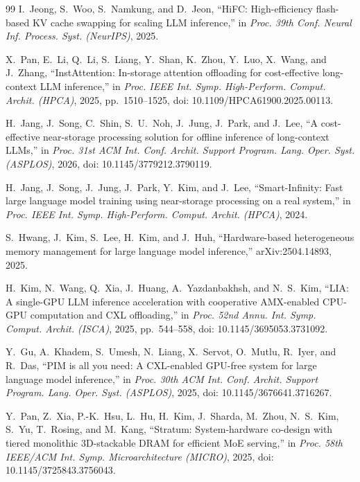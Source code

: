 \documentclass[conference,10pt]{IEEEtran}
\begin{document}
\begin{thebibliography}{99}
I.~Jeong, S.~Woo, S.~Namkung, and D.~Jeon, ``{HiFC}: High-efficiency
flash-based {KV} cache swapping for scaling {LLM} inference,'' in \emph{Proc.
39th Conf. Neural Inf. Process. Syst. (NeurIPS)}, 2025.

X.~Pan, E.~Li, Q.~Li, S.~Liang, Y.~Shan, K.~Zhou, Y.~Luo, X.~Wang, and
J.~Zhang, ``{InstAttention}: In-storage attention offloading for cost-effective
long-context {LLM} inference,'' in \emph{Proc. IEEE Int. Symp. High-Perform.
Comput. Archit. (HPCA)}, 2025, pp.~1510--1525,
doi: 10.1109/HPCA61900.2025.00113.

H.~Jang, J.~Song, C.~Shin, S.~U.~Noh, J.~Jung, J.~Park, and J.~Lee, ``A
cost-effective near-storage processing solution for offline inference of
long-context {LLMs},'' in \emph{Proc. 31st ACM Int. Conf. Archit. Support
Program. Lang. Oper. Syst. (ASPLOS)}, 2026, doi: 10.1145/3779212.3790119.

H.~Jang, J.~Song, J.~Jung, J.~Park, Y.~Kim, and J.~Lee, ``{Smart-Infinity}: Fast
large language model training using near-storage processing on a real system,''
in \emph{Proc. IEEE Int. Symp. High-Perform. Comput. Archit. (HPCA)}, 2024.

S.~Hwang, J.~Kim, S.~Lee, H.~Kim, and J.~Huh, ``Hardware-based heterogeneous
memory management for large language model inference,'' arXiv:2504.14893,
2025.

H.~Kim, N.~Wang, Q.~Xia, J.~Huang, A.~Yazdanbakhsh, and N.~S.~Kim, ``{LIA}: A
single-{GPU} {LLM} inference acceleration with cooperative {AMX}-enabled
{CPU-GPU} computation and {CXL} offloading,'' in \emph{Proc. 52nd Annu. Int.
Symp. Comput. Archit. (ISCA)}, 2025, pp.~544--558,
doi: 10.1145/3695053.3731092.

Y.~Gu, A.~Khadem, S.~Umesh, N.~Liang, X.~Servot, O.~Mutlu, R.~Iyer, and
R.~Das, ``{PIM} is all you need: A {CXL}-enabled {GPU}-free system for large
language model inference,'' in \emph{Proc. 30th ACM Int. Conf. Archit. Support
Program. Lang. Oper. Syst. (ASPLOS)}, 2025, doi: 10.1145/3676641.3716267.

Y.~Pan, Z.~Xia, P.-K.~Hsu, L.~Hu, H.~Kim, J.~Sharda, M.~Zhou, N.~S.~Kim,
S.~Yu, T.~Rosing, and M.~Kang, ``Stratum: System-hardware co-design with tiered
monolithic {3D}-stackable {DRAM} for efficient {MoE} serving,'' in \emph{Proc.
58th IEEE/ACM Int. Symp. Microarchitecture (MICRO)}, 2025,
doi: 10.1145/3725843.3756043.


\end{thebibliography}
\end{document}
